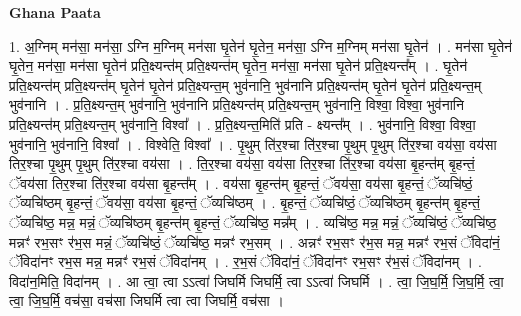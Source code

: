 \documentclass[17pt]{extarticle}
\begin{document}
\textbf{Ghana Paata } \newline

1. अ॒ग्निम् मन॑सा॒ मन॑सा॒ ऽग्नि म॒ग्निम् मन॑सा घृ॒तेन॑ घृ॒तेन॒ मन॑सा॒ ऽग्नि म॒ग्निम् मन॑सा घृ॒तेन॑ । . मन॑सा घृ॒तेन॑ घृ॒तेन॒ मन॑सा॒ मन॑सा घृ॒तेन॑ प्रति॒क्ष्यन्त॑म् प्रति॒क्ष्यन्त॑म् घृ॒तेन॒ मन॑सा॒ मन॑सा घृ॒तेन॑ प्रति॒क्ष्यन्त᳚म् । . घृ॒तेन॑ प्रति॒क्ष्यन्त॑म् प्रति॒क्ष्यन्त॑म् घृ॒तेन॑ घृ॒तेन॑ प्रति॒क्ष्यन्त॒म् भुव॑नानि॒ भुव॑नानि प्रति॒क्ष्यन्त॑म् घृ॒तेन॑ घृ॒तेन॑ प्रति॒क्ष्यन्त॒म् भुव॑नानि । . प्र॒ति॒क्ष्यन्त॒म् भुव॑नानि॒ भुव॑नानि प्रति॒क्ष्यन्त॑म् प्रति॒क्ष्यन्त॒म् भुव॑नानि॒ विश्वा॒ विश्वा॒ भुव॑नानि प्रति॒क्ष्यन्त॑म् प्रति॒क्ष्यन्त॒म् भुव॑नानि॒ विश्वा᳚ । . प्र॒ति॒क्ष्यन्त॒मिति॑ प्रति - क्ष्यन्त᳚म् । . भुव॑नानि॒ विश्वा॒ विश्वा॒ भुव॑नानि॒ भुव॑नानि॒ विश्वा᳚ । . विश्वेति॒ विश्वा᳚ । . पृ॒थुम् ति॑र॒श्चा ति॑र॒श्चा पृ॒थुम् पृ॒थुम् ति॑र॒श्चा वय॑सा॒ वय॑सा तिर॒श्चा पृ॒थुम् पृ॒थुम् ति॑र॒श्चा वय॑सा । . ति॒र॒श्चा वय॑सा॒ वय॑सा तिर॒श्चा ति॑र॒श्चा वय॑सा बृ॒हन्त॑म् बृ॒हन्तं॒ ॅवय॑सा तिर॒श्चा ति॑र॒श्चा वय॑सा बृ॒हन्त᳚म् । . वय॑सा बृ॒हन्त॑म् बृ॒हन्तं॒ ॅवय॑सा॒ वय॑सा बृ॒हन्तं॒ ॅव्यचि॑ष्ठं॒ ॅव्यचि॑ष्ठम् बृ॒हन्तं॒ ॅवय॑सा॒ वय॑सा बृ॒हन्तं॒ ॅव्यचि॑ष्ठम् । . बृ॒हन्तं॒ ॅव्यचि॑ष्ठं॒ ॅव्यचि॑ष्ठम् बृ॒हन्त॑म् बृ॒हन्तं॒ ॅव्यचि॑ष्ठ॒ मन्न॒ मन्नं॒ ॅव्यचि॑ष्ठम् बृ॒हन्त॑म् बृ॒हन्तं॒ ॅव्यचि॑ष्ठ॒ मन्न᳚म् । . व्यचि॑ष्ठ॒ मन्न॒ मन्नं॒ ॅव्यचि॑ष्ठं॒ ॅव्यचि॑ष्ठ॒ मन्नꣳ॑ रभ॒सꣳ र॑भ॒स मन्नं॒ ॅव्यचि॑ष्ठं॒ ॅव्यचि॑ष्ठ॒ मन्नꣳ॑ रभ॒सम् । . अन्नꣳ॑ रभ॒सꣳ र॑भ॒स मन्न॒ मन्नꣳ॑ रभ॒सं ॅविदा॑नं॒ ॅविदा॑नꣳ रभ॒स मन्न॒ मन्नꣳ॑ रभ॒सं ॅविदा॑नम् । . र॒भ॒सं ॅविदा॑नं॒ ॅविदा॑नꣳ रभ॒सꣳ र॑भ॒सं ॅविदा॑नम् । . विदा॑न॒मिति॒ विदा॑नम् । . आ त्वा॒ त्वा ऽऽत्वा॑ जिघर्मि जिघर्मि॒ त्वा ऽऽत्वा॑ जिघर्मि । . त्वा॒ जि॒घ॒र्मि॒ जि॒घ॒र्मि॒ त्वा॒ त्वा॒ जि॒घ॒र्मि॒ वच॑सा॒ वच॑सा जिघर्मि त्वा त्वा जिघर्मि॒ वच॑सा । \newline
\end{document}
